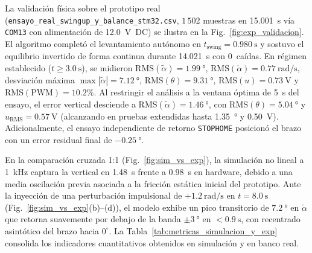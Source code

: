 La validación física sobre el prototipo real (\nolinkurl{ensayo_real_swingup_y_balance_stm32.csv}, $1\,502$ muestras en \qty{15.001}{\second} vía \texttt{COM13} con alimentación de \qty{12.0}{\volt}~DC) se ilustra en la Fig.~\ref{fig:exp_validacion}. El algoritmo completó el levantamiento autónomo en $t_{\text{swing}} = \qty{0.980}{\second}$ y sostuvo el equilibrio invertido de forma continua durante \qty{14.021}{\second} con $0$~caídas. En régimen establecido ($t \ge \qty{3.0}{\second}$), se midieron $\mathrm{RMS}(\tilde{\alpha}) = \qty{1.99}{\degree}$, $\mathrm{RMS}(\dot{\alpha}) = \qty{0.77}{\radian\per\second}$, desviación máxima $\max|\tilde{\alpha}| = \qty{7.12}{\degree}$, $\mathrm{RMS}(\theta) = \qty{9.31}{\degree}$, $\mathrm{RMS}(u) = \qty{0.73}{\volt}$ y $\mathrm{RMS}(\text{PWM}) = 10.2\%$. Al restringir el análisis a la ventana óptima de \qty{5}{\second} del ensayo, el error vertical desciende a $\mathrm{RMS}(\tilde{\alpha}) = \qty{1.46}{\degree}$, con $\mathrm{RMS}(\theta) = \qty{5.04}{\degree}$ y $u_{\mathrm{RMS}} = \qty{0.57}{\volt}$ (alcanzando en pruebas extendidas hasta \qty{1.35}{\degree} y \qty{0.50}{\volt}). Adicionalmente, el ensayo independiente de retorno \texttt{STOPHOME} posicionó el brazo con un error residual final de $\qty{-0.25}{\degree}$.

En la comparación cruzada 1:1 (Fig.~\ref{fig:sim_vs_exp}), la simulación no lineal a \qty{1}{\kilo\hertz} captura la vertical en \qty{1.48}{\second} frente a \qty{0.98}{\second} en hardware, debido a una media oscilación previa asociada a la fricción estática inicial del prototipo. Ante la inyección de una perturbación impulsional de $+\qty{1.2}{\radian\per\second}$ en $t = \qty{8.0}{\second}$ (Fig.~\ref{fig:sim_vs_exp}(b)--(d)), el modelo exhibe un pico transitorio de $\qty{7.2}{\degree}$ en $\tilde{\alpha}$ que retorna suavemente por debajo de la banda $\pm\qty{3}{\degree}$ en $< \qty{0.9}{\second}$, con recentrado asintótico del brazo hacia $0^\circ$. La Tabla~\ref{tab:metricas_simulacion_y_exp} consolida los indicadores cuantitativos obtenidos en simulación y en banco real.

